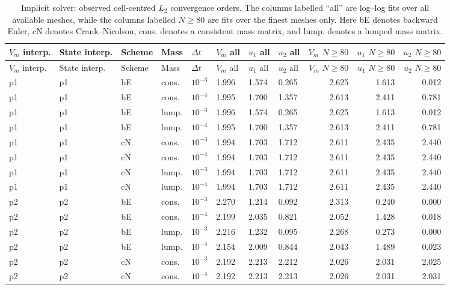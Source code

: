 \scriptsize
\begin{longtable}{llllllllrrr}
\caption{Implicit solver: observed cell-centred $L_2$ convergence orders. The columns labelled ``all'' are log--log fits over all available meshes, while the columns labelled $N\ge80$ are fits over the finest meshes only. Here bE denotes backward Euler, cN denotes Crank--Nicolson, cons. denotes a consistent mass matrix, and lump. denotes a lumped mass matrix.}\label{tab:implicit-orders}\\
\toprule
$V_m$ interp. & State interp. & Scheme & Mass & $\Delta t$ & $V_m$ all & $u_1$ all & $u_2$ all & $V_m$ $N\ge80$ & $u_1$ $N\ge80$ & $u_2$ $N\ge80$ \\
\midrule
\endfirsthead
\toprule
$V_m$ interp. & State interp. & Scheme & Mass & $\Delta t$ & $V_m$ all & $u_1$ all & $u_2$ all & $V_m$ $N\ge80$ & $u_1$ $N\ge80$ & $u_2$ $N\ge80$ \\
\midrule
\endhead
p1 & p1 & bE & cons. & $10^{-3}$ & 1.996 & 1.574 & 0.265 & 2.625 & 1.613 & 0.012 \\
p1 & p1 & bE & cons. & $10^{-4}$ & 1.995 & 1.700 & 1.357 & 2.613 & 2.411 & 0.781 \\
p1 & p1 & bE & lump. & $10^{-3}$ & 1.996 & 1.574 & 0.265 & 2.625 & 1.613 & 0.012 \\
p1 & p1 & bE & lump. & $10^{-4}$ & 1.995 & 1.700 & 1.357 & 2.613 & 2.411 & 0.781 \\
p1 & p1 & cN & cons. & $10^{-3}$ & 1.994 & 1.703 & 1.712 & 2.611 & 2.435 & 2.440 \\
p1 & p1 & cN & cons. & $10^{-4}$ & 1.994 & 1.703 & 1.712 & 2.611 & 2.435 & 2.440 \\
p1 & p1 & cN & lump. & $10^{-3}$ & 1.994 & 1.703 & 1.712 & 2.611 & 2.435 & 2.440 \\
p1 & p1 & cN & lump. & $10^{-4}$ & 1.994 & 1.703 & 1.712 & 2.611 & 2.435 & 2.440 \\
p2 & p2 & bE & cons. & $10^{-3}$ & 2.270 & 1.214 & 0.092 & 2.313 & 0.240 & 0.000 \\
p2 & p2 & bE & cons. & $10^{-4}$ & 2.199 & 2.035 & 0.821 & 2.052 & 1.428 & 0.018 \\
p2 & p2 & bE & lump. & $10^{-3}$ & 2.216 & 1.232 & 0.095 & 2.268 & 0.273 & 0.000 \\
p2 & p2 & bE & lump. & $10^{-4}$ & 2.154 & 2.009 & 0.844 & 2.043 & 1.489 & 0.023 \\
p2 & p2 & cN & cons. & $10^{-3}$ & 2.192 & 2.213 & 2.212 & 2.026 & 2.031 & 2.025 \\
p2 & p2 & cN & cons. & $10^{-4}$ & 2.192 & 2.213 & 2.213 & 2.026 & 2.031 & 2.031 \\

\end{longtable}
